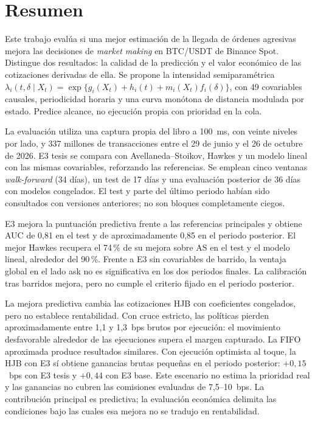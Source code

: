 \chapter*{Resumen}

Este trabajo evalúa si una mejor estimación de la llegada de órdenes agresivas mejora las decisiones de \textit{market making} en BTC/USDT de Binance Spot. Distingue dos resultados: la calidad de la predicción y el valor económico de las cotizaciones derivadas de ella. Se propone la intensidad semiparamétrica
$\lambda_i(t,\delta\mid X_t)=\exp\{g_i(X_t)+h_i(t)+m_i(X_t)f_i(\delta)\}$,
con 49 covariables causales, periodicidad horaria y una curva monótona de distancia modulada por estado. Predice alcance, no ejecución propia con prioridad en la cola.

La evaluación utiliza una captura propia del libro a 100~ms, con veinte niveles por lado, y 337 millones de transacciones entre el 29 de junio y el 26 de octubre de 2026. E3 tesis se compara con Avellaneda--Stoikov, Hawkes y un modelo lineal con las mismas covariables, reforzando las referencias. Se emplean cinco ventanas \textit{walk-forward} (34 días), un test de 17 días y una evaluación posterior de 36 días con modelos congelados. El test y parte del último periodo habían sido consultados con versiones anteriores; no son bloques completamente ciegos.

E3 mejora la puntuación predictiva frente a las referencias principales y obtiene AUC de 0,81 en el test y de aproximadamente 0,85 en el periodo posterior. El mejor Hawkes recupera el 74\,\% de su mejora sobre AS en el test y el modelo lineal, alrededor del 90\,\%. Frente a E3 sin covariables de barrido, la ventaja global en el lado ask no es significativa en los dos periodos finales. La calibración tras barridos mejora, pero no cumple el criterio fijado en el periodo posterior.

La mejora predictiva cambia las cotizaciones HJB con coeficientes congelados, pero no establece rentabilidad. Con cruce estricto, las políticas pierden aproximadamente entre 1,1 y 1,3~bps brutos por ejecución: el movimiento desfavorable alrededor de las ejecuciones supera el margen capturado. La FIFO aproximada produce resultados similares. Con ejecución optimista al toque, la HJB con E3 sí obtiene ganancias brutas pequeñas en el periodo posterior: $+0{,}15$~bps con E3 tesis y $+0{,}44$ con E3 base. Este escenario no estima la prioridad real y las ganancias no cubren las comisiones evaluadas de 7,5--10~bps. La contribución principal es predictiva; la evaluación económica delimita las condiciones bajo las cuales esa mejora no se tradujo en rentabilidad.

